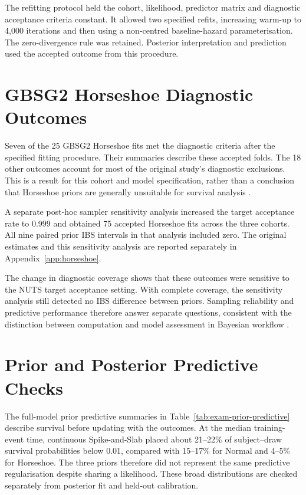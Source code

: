 The refitting protocol held the cohort, likelihood, predictor matrix and diagnostic acceptance criteria constant. It allowed two specified refits, increasing warm-up to 4,000 iterations and then using a non-centred baseline-hazard parameterisation. The zero-divergence rule was retained. Posterior interpretation and prediction used the accepted outcome from this procedure.

\section{GBSG2 Horseshoe Diagnostic Outcomes}\label{gbsg2-horseshoe-diagnostic-failure}

Seven of the 25 GBSG2 Horseshoe fits met the diagnostic criteria after the specified fitting procedure. Their summaries describe these accepted folds. The 18 other outcomes account for most of the original study's diagnostic exclusions. This is a result for this cohort and model specification, rather than a conclusion that Horseshoe priors are generally unsuitable for survival analysis \cite{ref39,piironen2017}.

A separate post-hoc sampler sensitivity analysis increased the target acceptance rate to 0.999 and obtained 75 accepted Horseshoe fits across the three cohorts. All nine paired prior IBS intervals in that analysis included zero. The original estimates and this sensitivity analysis are reported separately in Appendix~\ref{app:horseshoe}.

The change in diagnostic coverage shows that these outcomes were sensitive to the NUTS target acceptance setting. With complete coverage, the sensitivity analysis still detected no IBS difference between priors. Sampling reliability and predictive performance therefore answer separate questions, consistent with the distinction between computation and model assessment in Bayesian workflow \cite{ref53,ref39}.

\section{Prior and Posterior Predictive Checks}\label{posterior-predictive-results}

The full-model prior predictive summaries in Table~\ref{tab:exam-prior-predictive} describe survival before updating with the outcomes. At the median training-event time, continuous Spike-and-Slab placed about 21--22\% of subject--draw survival probabilities below 0.01, compared with 15--17\% for Normal and 4--5\% for Horseshoe. The three priors therefore did not represent the same predictive regularisation despite sharing a likelihood. These broad distributions are checked separately from posterior fit and held-out calibration.

